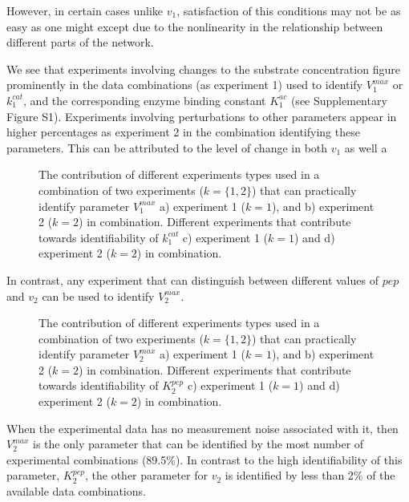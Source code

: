 \documentclass[10pt]{article}
\begin{document}
{However, in certain cases unlike $v_1$, satisfaction of this conditions may not be as easy as one might except due to the nonlinearity in the relationship between different parts of the network.



We see that experiments involving changes to the substrate concentration figure prominently in the data combinations (as experiment 1) used to identify $V_1^{max}$ or $k_1^{cat}$, and the corresponding enzyme binding constant $K_1^{ac}$ (see Supplementary Figure S1). Experiments involving perturbations to other parameters appear in higher percentages as experiment 2 in the combination identifying these parameters. This can be attributed to the level of change in both $v_1$ as well a

\begin{figure}[!tbhp]
	\caption{The contribution of different experiments types used in a combination of two experiments ($k = \{1, 2\}$) that can practically identify parameter $V_1^{max}$ a) experiment 1 ($k=1$), and b) experiment 2 ($k=2$) in combination. Different experiments that contribute towards identifiability of $k_1^{cat}$ c) experiment 1 ($k=1$) and d) experiment 2 ($k=2$) in combination.}\label{fig:figure2}
\end{figure}

In contrast, any experiment that can distinguish between different values of $pep$ and $v_2$ can be used to identify $V_2^{max}$. 

\begin{figure}[!tbhp]
	\caption{The contribution of different experiments types used in a combination of two experiments ($k = \{1, 2\}$) that can practically identify parameter $V_2^{max}$ a) experiment 1 ($k=1$), and b) experiment 2 ($k=2$) in combination. Different experiments that contribute towards identifiability of $K_2^{pep}$ c) experiment 1 ($k=1$) and d) experiment 2 ($k=2$) in combination.}\label{fig:figure3}
\end{figure}




When the experimental data has no measurement noise associated with it, then $V_2^{max}$ is the only parameter that can be identified by the most number of experimental combinations (89.5\%). In contrast to the high identifiability of this parameter, $K_2^{pep}$, the other parameter for $v_2$ is identified by less than 2\% of the available data combinations.

}
\end{document}
